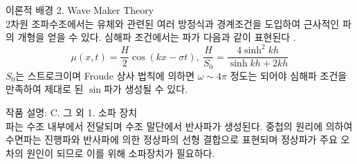 \documentclass[a0paper,portrait]{Junlam_PosterP}
\begin{document}
\begin{poster}
\begin{posterbox}[name=theo,column=0,below=intro]{이론적 배경}
   \small {2. Wave Maker Theory\\}
     \scriptsize 2차원 조파수조에서는 유체와 관련된 여러 방정식과 경계조건을 도입하여 근사적인 파의 개형을 얻을 수 있다. 심해파 조건에서는 파가 다음과 같이 표현된다 \cite{ART002413750, ART002785404, dean1991water}.
      \begin{equation*}
         \mu(x,t)=\frac{H}{2}\cos(kx-\sigma t),~\frac{H}{S_0}=\frac{4\sinh^2 kh}{\sinh kh + 2kh}
      \end{equation*}
         $S_0$는 스트로크이며 Froude 상사 법칙에 의하면 $\omega \sim 4\pi$ 정도는 되어야 심해파 조건을 만족하여 제대로 된 $\sin$파가 생성될 수 있다.
\end{posterbox}

\begin{posterbox}[name=wmaker,column=0,below=theo, above=bottom] {작품 설명: C. 그 외}
\small {1. 소파 장치\\}
    \scriptsize {파는 수조 내부에서 전달되며 수조 말단에서 반사파가 생성된다. 중첩의 원리에 의하여 수면파는 진행파와 반사파에 의한 정상파의 선형 결합으로 표현되며 정상파가 주요 오차의 원인이 되므로 이를 위해 소파장치가 필요하다.}\\


\end{posterbox}
\end{poster}
\end{document}
